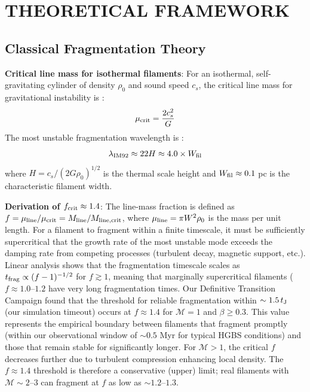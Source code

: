 \documentclass[twoside,twocolumn]{mnras}
\begin{document}
\section{THEORETICAL FRAMEWORK}

\subsection{Classical Fragmentation Theory}

\textbf{Critical line mass for isothermal filaments}: For an isothermal, self-gravitating cylinder of density $\rho_0$ and sound speed $c_s$, the critical line mass for gravitational instability is \citep{Ostriker1964}:
\begin{equation}
\mu_{\rm crit} = \frac{2c_s^2}{G}
\end{equation}
The most unstable fragmentation wavelength is \citep{Inutsuka1992}:
\begin{equation}
\lambda_{\rm IM92} \approx 22 H \approx 4.0 \times W_{\rm fil}
\label{eq:im92}
\end{equation}
where $H = c_s/(2G\rho_0)^{1/2}$ is the thermal scale height and $W_{\rm fil} \approx 0.1$ pc is the characteristic filament width.

\textbf{Derivation of $f_{\rm crit} \approx 1.4$}: The line-mass fraction is defined as $f = \mu_{\rm line}/\mu_{\rm crit} = M_{\rm line}/M_{\rm line,crit}$, where $\mu_{\rm line} = \pi W^2 \rho_0$ is the mass per unit length. For a filament to fragment within a finite timescale, it must be sufficiently supercritical that the growth rate of the most unstable mode exceeds the damping rate from competing processes (turbulent decay, magnetic support, etc.). Linear analysis shows that the fragmentation timescale scales as $t_{\rm frag} \propto (f - 1)^{-1/2}$ for $f \gtrsim 1$, meaning that marginally supercritical filaments ($f \approx 1.0$--$1.2$ have very long fragmentation times. Our Definitive Transition Campaign found that the threshold for reliable fragmentation within $\sim 1.5\,t_{\rm J}$ (our simulation timeout) occurs at $f \approx 1.4$ for $\mathcal{M} = 1$ and $\beta \geq 0.3$. This value represents the empirical boundary between filaments that fragment promptly (within our observational window of $\sim 0.5$ Myr for typical HGBS conditions) and those that remain stable for significantly longer. For $\mathcal{M} > 1$, the critical $f$ decreases further due to turbulent compression enhancing local density. The $f \approx 1.4$ threshold is therefore a conservative (upper) limit; real filaments with $\mathcal{M} \sim 2$--$3$ can fragment at $f$ as low as $\sim 1.2$--$1.3$.
\end{document}
